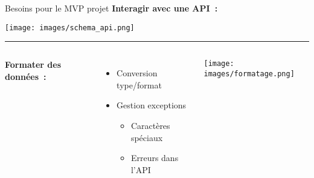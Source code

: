 \begin{frame}{Besoins pour le MVP projet}
\vspace*{-0.4cm}
\hspace*{-0.43cm}
\textbf{Interagir avec une API~:}
\vspace*{-0.3cm}

        \begin{center}
            \texttt{[image: images/schema\_api.png]}
        \end{center}

\vspace{0.3cm}
\vfill
\hrule
\vfill
\vspace{0.5cm}

\begin{columns}[T]
    \textbf{Formater des données~:}
    \begin{itemize}
        \item Conversion type/format
        \item Gestion exceptions
        \begin{itemize}
            \item Caractères spéciaux
            \item Erreurs dans l'API
        \end{itemize}
    \end{itemize}


    \vspace*{-0.3cm}
    \texttt{[image: images/formatage.png]}
    
\end{columns}
    
\end{frame}

